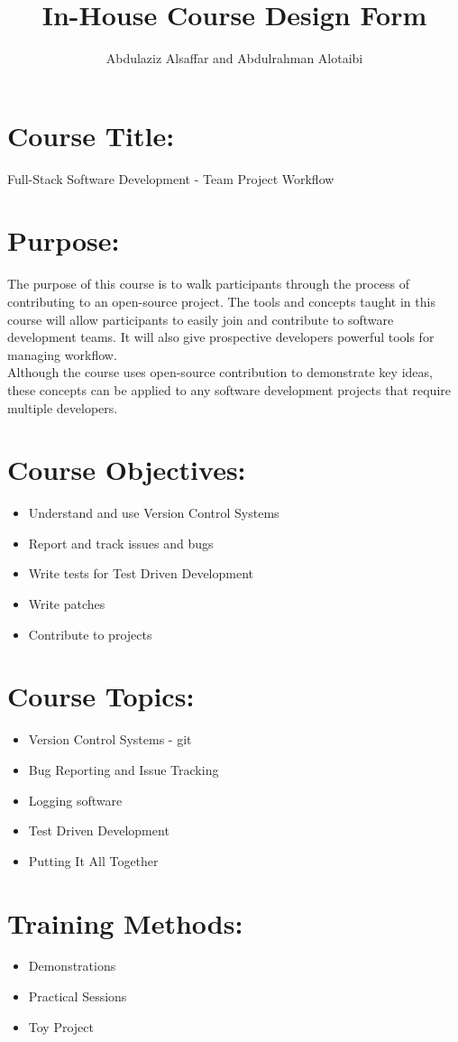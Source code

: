\documentclass[a4paper,11pt]{article}
\author{Abdulaziz Alsa{f}far and Abdulrahman Alotaibi}
\title{In-House Course Design Form}
\begin{document}
\pagestyle{plain}
\setcounter{page}{1}

\section{Course Title:}
Full-Stack Software Development - Team Project Workflow

\section{Purpose:}
The purpose of this course is to walk participants through the process of contributing to an open-source project.
The tools and concepts taught in this course will allow participants to easily join and contribute to software development teams. It will also give prospective developers powerful tools for managing workflow.\\
Although the course uses open-source contribution to demonstrate key ideas, these concepts can be applied to any software development projects that require multiple developers.

\section{Course Objectives:}
\begin{itemize}
	\item Understand and use Version Control Systems
	\item Report and track issues and bugs
	\item Write tests for Test Driven Development
	\item Write patches
	\item Contribute to projects
\end{itemize}

\section{Course Topics:}
\begin{itemize}
	\item Version Control Systems - git
	\item Bug Reporting and Issue Tracking
	\item Logging software
	\item Test Driven Development
	\item Putting It All Together
\end{itemize}

\section{Training Methods:}
\begin{itemize}
	\item Demonstrations
	\item Practical Sessions
	\item Toy Project
\end{itemize}
\end{document}
